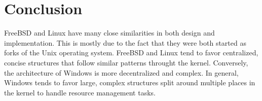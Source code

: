\documentclass[letterpaper,draftclsnofoot,10pt,onecolumn,titlepage]{IEEEtran}\usepackage[margin=0.75in]{geometry}
\begin{document}
\section{Conclusion}
FreeBSD and Linux have many close similarities in both design and implementation. This is mostly due to the fact
that they were both started as forks of the Unix operating system. FreeBSD and Linux tend to favor centralized, 
concise structures that follow similar patterns throught the kernel. Conversely, the architecture of Windows is
more decentralized and complex. In general, Windows tends to favor large, complex structures split around 
multiple places in the kernel to handle resource management tasks.




\end{document}
